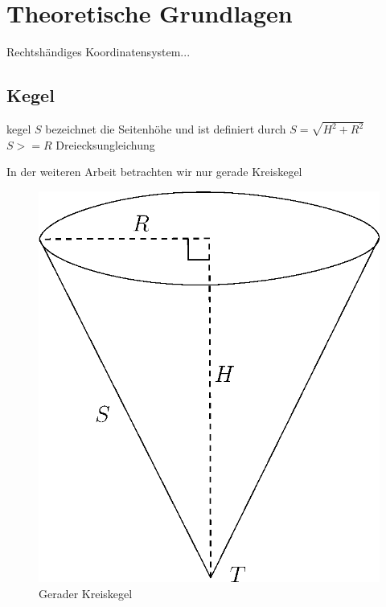 \chapter{Theoretische Grundlagen}
\label{ch:theory}

Rechtshändiges Koordinatensystem...

\section{Kegel}
\label{s:cone}

\begin{definition}[Kegel]
	kegel
	$S$ bezeichnet die Seitenhöhe und ist definiert durch $S = \sqrt{H^2 + R^2}$
	$S >= R$ Dreiecksungleichung
\end{definition}

In der weiteren Arbeit betrachten wir nur gerade Kreiskegel

\begin{figure}[!htb]
	\centering
	\includegraphics[scale=.5]{images/fullCone.eps}
	\caption{Gerader Kreiskegel}
	\label{fig:cone}
\end{figure}

